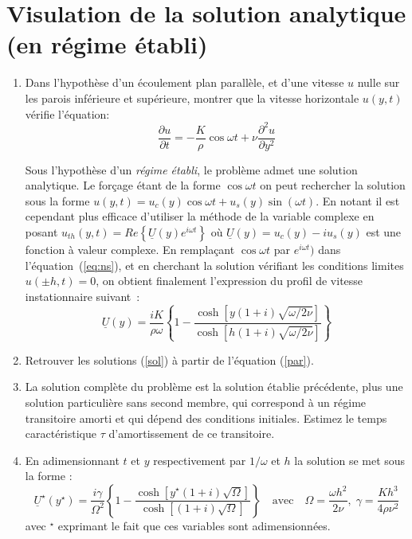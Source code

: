 \documentclass[a4,12pt]{article}
\begin{document}
\section{Visulation de la solution analytique (en régime établi)}
\begin{enumerate}
\item Dans l'hypoth\`ese d'un \'ecoulement plan parall\`ele, et d'une vitesse $u$ nulle sur les 
parois inf\'erieure et sup\'erieure,
 montrer que
la vitesse horizontale $u(y, t)$ v\'erifie l'\'equation:
\begin{equation}
\label{par}
  \frac{\partial u}{\partial t} 
  = 
  - \frac{K}{\rho} \cos \omega t + \nu \frac{\partial^2 u}{\partial y^2}
  \label{eq:ns}
\end{equation}

\noindent
Sous l'hypothèse d'un {\em régime établi}, le problème admet une solution analytique. Le forçage étant de la forme $\cos \omega t $ on peut rechercher la solution sous la forme $u(y,t) = u_c(y) \cos \omega t + u_s(y) \sin(\omega t)$. En notant il est cependant plus efficace d'utiliser la méthode de la variable complexe en posant $u_{th}(y, t) = Re \left \{ \underline{U}(y) e^{i \omega t} \right \}$ où $\underline{U}(y) = u_c(y) - i u_s(y)$ est une fonction à valeur complexe. En remplaçant $\cos \omega t$ par $e^{i\omega t})$  dans l'\'equation~(\ref{eq:ns}), et en cherchant la solution vérifiant les conditions limites $u(\pm h,t) = 0$, on obtient finalement l'expression du profil de vitesse instationnaire suivant~:
\begin{equation}
\label{sol}
 \underline{U}(y) = \frac{iK}{\rho \omega} \left \{ 
1 - \frac{\cosh [ y ( 1+i) \sqrt{\omega / 2\nu} ]}{\cosh [ 
h ( 1+i) \sqrt{\omega / 2\nu} ]}
\right \}
\end{equation}
\item Retrouver les solutions (\ref{sol}) \`a partir de l'\'equation (\ref{par}).

\item La solution complète du problème est la solution établie précédente,
plus une solution particulière sans second membre, qui correspond à un
régime transitoire amorti et qui dépend des conditions
initiales. Estimez le temps caractéristique $\tau$ d'amortissement de ce transitoire.
 

\item En adimensionnant $t$ et $y$ respectivement par $1/\omega$
et $h$ la solution se met sous la forme :
\begin{equation}
\label{soladim}
 \underline{U}^\star(y^\star) = \frac{i\gamma}{\Omega^2} \left \{
1 - \frac{\cosh [ y^\star ( 1+i) \sqrt{\Omega} ]}{\cosh [ 
( 1+i) \sqrt{\Omega} ]} \right \}
\quad
\mbox{avec} \quad
\Omega = \frac{\omega h^2}{2\nu}, \; \gamma = \frac{Kh^3}{4\rho \nu^2}
\end{equation}
\noindent 
avec $^\star$ exprimant le fait que ces variables sont adimensionn\'ees. 


\end{enumerate}
\end{document}
